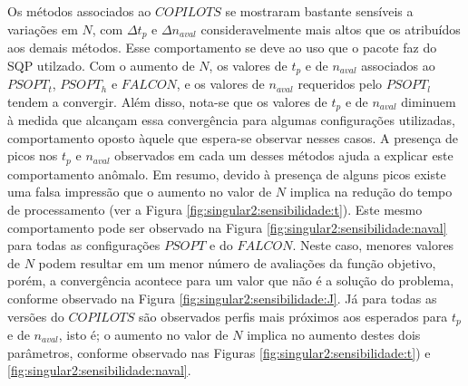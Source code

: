 Os métodos associados ao $ COPILOTS $ se mostraram bastante sensíveis a variações em $ N $, com $ \Delta t_p $ e $ \Delta n_{aval} $ consideravelmente mais altos que os atribuídos aos demais métodos. Esse comportamento se deve ao uso que o pacote faz do SQP utilzado. Com o aumento de $ N $, os valores de $ t_p $ e de $ n_{aval} $ associados ao $ PSOPT_t $, $ PSOPT_h $ e $ FALCON $, e os valores de $ n_{aval} $ requeridos pelo $ PSOPT_l $ tendem a convergir. Além disso, nota-se que os valores de $ t_p $ e de $ n_{aval} $ diminuem à medida que alcançam essa convergência para algumas configurações utilizadas, comportamento oposto àquele que espera-se observar nesses casos. A presença de picos nos $ t_p $ e $ n_{aval} $ observados em cada um desses métodos ajuda a explicar este comportamento anômalo. Em resumo, devido à presença de alguns picos existe uma falsa impressão que o aumento no valor de $N$ implica na redução do tempo de processamento (ver a Figura \ref{fig:singular2:sensibilidade:t}). Este mesmo comportamento pode ser observado na Figura \ref{fig:singular2:sensibilidade:naval} para todas as configurações $ PSOPT$ e do $FALCON $. Neste caso, menores valores de $N$ podem resultar em um menor número de avaliações da função objetivo, porém, a convergência acontece para um valor que não é a solução do problema, conforme observado na Figura \ref{fig:singular2:sensibilidade:J}. Já para todas as versões do $ COPILOTS $ são observados perfis mais próximos aos esperados para $ t_p $ e de $ n_{aval} $, isto é; o aumento no valor de $N$ implica no aumento destes dois parâmetros, conforme observado nas Figuras \ref{fig:singular2:sensibilidade:t}) e  \ref{fig:singular2:sensibilidade:naval}.

